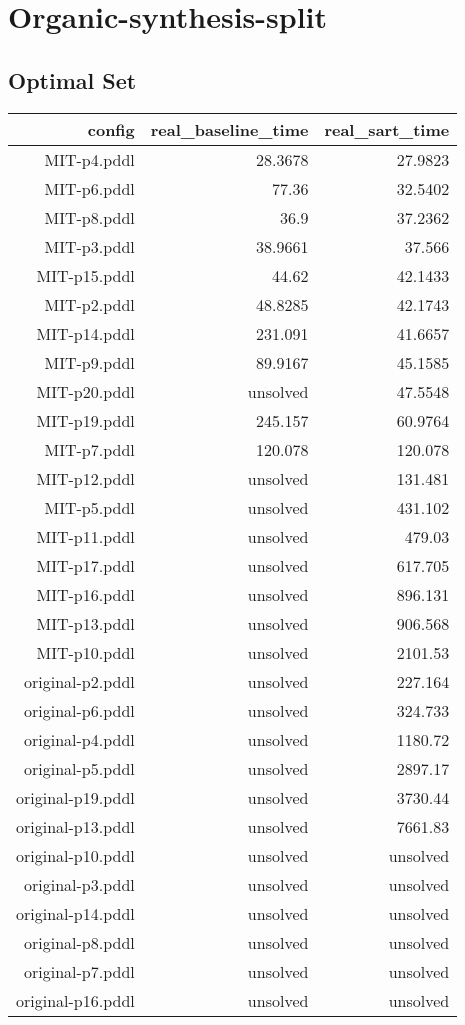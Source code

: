 \documentclass{article}
\begin{document}
                \newpage \section{Organic-synthesis-split}
                    \subsection*{Optimal Set}
                    
                            \begin{center}
                            \scriptsize
                            \begin{tabular}{r|r|r}
                            config & real\_baseline\_time & real\_sart\_time\\\midrule
                             MIT-p4.pddl&28.3678&27.9823\\
 MIT-p6.pddl&77.36&32.5402\\
 MIT-p8.pddl&36.9&37.2362\\
 MIT-p3.pddl&38.9661&37.566\\
 MIT-p15.pddl&44.62&42.1433\\
 MIT-p2.pddl&48.8285&42.1743\\
 MIT-p14.pddl&231.091&41.6657\\
 MIT-p9.pddl&89.9167&45.1585\\
 MIT-p20.pddl&unsolved&47.5548\\
 MIT-p19.pddl&245.157&60.9764\\
 MIT-p7.pddl&120.078&120.078\\
 MIT-p12.pddl&unsolved&131.481\\
 MIT-p5.pddl&unsolved&431.102\\
 MIT-p11.pddl&unsolved&479.03\\
 MIT-p17.pddl&unsolved&617.705\\
 MIT-p16.pddl&unsolved&896.131\\
 MIT-p13.pddl&unsolved&906.568\\
 MIT-p10.pddl&unsolved&2101.53\\
 original-p2.pddl&unsolved&227.164\\
 original-p6.pddl&unsolved&324.733\\
 original-p4.pddl&unsolved&1180.72\\
 original-p5.pddl&unsolved&2897.17\\
 original-p19.pddl&unsolved&3730.44\\
 original-p13.pddl&unsolved&7661.83\\
 original-p10.pddl&unsolved&unsolved\\
 original-p3.pddl&unsolved&unsolved\\
 original-p14.pddl&unsolved&unsolved\\
 original-p8.pddl&unsolved&unsolved\\
 original-p7.pddl&unsolved&unsolved\\
 original-p16.pddl&unsolved&unsolved
                            \end{tabular}
                            \end{center}
                    
\end{document}
